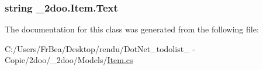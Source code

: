 \hypertarget{class__2doo_1_1_item_60fcc3a7c4a46ba6bcc542822c627681}{
\subsubsection[{Text}]{\setlength{\rightskip}{0pt plus 5cm}string \_\-2doo.Item.Text}}
\label{class__2doo_1_1_item_60fcc3a7c4a46ba6bcc542822c627681}




The documentation for this class was generated from the following file:\begin{CompactItemize}
\item 
C:/Users/FrBea/Desktop/rendu/DotNet\_\-todolist\_ - Copie/2doo/\_\-2doo/Models/\hyperlink{_item_8cs}{Item.cs}\end{CompactItemize}
